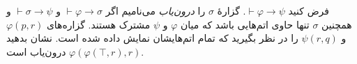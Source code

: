 فرض کنید
$\vdash\varphi\to\psi$.
گزارهٔ
$\sigma$
را
\emph{درون‌یاب}
می‌نامیم اگر
$\vdash\varphi\to\sigma$
و
$\vdash\sigma\to\psi$
و همچنین
$\sigma$
تنها حاوی اتم‌هایی باشد که میان
$\varphi$
و
$\psi$
مشترک هستند.
گزاره‌های
$\varphi(p,r)$
و
$\psi(r,q)$
را در نظر بگیرید که تمام اتم‌هایشان نمایش داده شده است. نشان بدهید
$\varphi(\varphi(\top,r),r)$
درون‌یاب است.